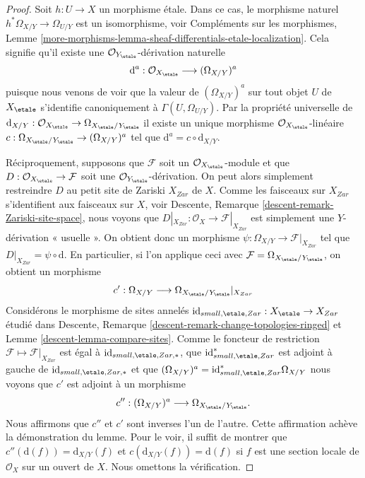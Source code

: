 \begin{proof}
Soit $h : U \to X$ un morphisme étale. Dans ce cas, le morphisme naturel
$h^*\Omega_{X/Y} \to \Omega_{U/Y}$ est un isomorphisme, voir
Compléments sur les morphismes,
Lemme \ref{more-morphisms-lemma-sheaf-differentials-etale-localization}.
Cela signifie qu'il existe une $\mathcal{O}_{Y_\etale}$-dérivation naturelle
$$
\text{d}^a : \mathcal{O}_{X_\etale} \longrightarrow (\Omega_{X/Y})^a
$$
puisque nous venons de voir que la valeur de $(\Omega_{X/Y})^a$ sur tout objet
$U$ de $X_\etale$ s'identifie canoniquement à
$\Gamma(U, \Omega_{U/Y})$. Par la propriété universelle de
$\text{d}_{X/Y} :
\mathcal{O}_{X_\etale}
\to
\Omega_{X_\etale/Y_\etale}$
il existe un unique morphisme $\mathcal{O}_{X_\etale}$-linéaire
$c : \Omega_{X_\etale/Y_\etale} \to (\Omega_{X/Y})^a$
tel que
$\text{d}^a = c \circ \text{d}_{X/Y}$.

\medskip\noindent
Réciproquement, supposons que $\mathcal{F}$ soit un
$\mathcal{O}_{X_\etale}$-module
et que $D : \mathcal{O}_{X_\etale} \to \mathcal{F}$ soit une
$\mathcal{O}_{Y_\etale}$-dérivation. On peut alors simplement restreindre
$D$ au petit site de Zariski $X_{Zar}$ de $X$. Comme les faisceaux sur $X_{Zar}$
s'identifient aux faisceaux sur $X$, voir
Descente, Remarque \ref{descent-remark-Zariski-site-space},
nous voyons que $D|_{X_{Zar}} : \mathcal{O}_X \to \mathcal{F}|_{X_{Zar}}$
est simplement une $Y$-dérivation « usuelle ». On obtient donc un morphisme
$\psi : \Omega_{X/Y} \longrightarrow \mathcal{F}|_{X_{Zar}}$
tel que $D|_{X_{Zar}} = \psi \circ \text{d}$. En particulier, si l'on
applique ceci avec $\mathcal{F} = \Omega_{X_\etale/Y_\etale}$,
on obtient un morphisme
$$
c' :
\Omega_{X/Y}
\longrightarrow
\Omega_{X_\etale/Y_\etale}|_{X_{Zar}}
$$
Considérons le morphisme de sites annelés
$\text{id}_{small, \etale, Zar} : X_\etale \to X_{Zar}$
étudié dans
Descente, Remarque \ref{descent-remark-change-topologies-ringed} et
Lemme \ref{descent-lemma-compare-sites}.
Comme le foncteur de restriction $\mathcal{F} \mapsto \mathcal{F}|_{X_{Zar}}$
est égal à $\text{id}_{small, \etale, Zar, *}$, que
$\text{id}_{small, \etale, Zar}^*$ est adjoint à gauche de
$\text{id}_{small, \etale, Zar, *}$ et que
$(\Omega_{X/Y})^a = \text{id}_{small, \etale, Zar}^*\Omega_{X/Y}$
nous voyons que $c'$ est adjoint à un morphisme
$$
c'' :
(\Omega_{X/Y})^a
\longrightarrow
\Omega_{X_\etale/Y_\etale}.
$$
Nous affirmons que $c''$ et $c'$ sont inverses l'un de l'autre.
Cette affirmation achève la démonstration du lemme.
Pour le voir, il suffit de montrer que $c''(\text{d}(f)) = \text{d}_{X/Y}(f)$
et $c(\text{d}_{X/Y}(f)) = \text{d}(f)$ si $f$ est une section locale de
$\mathcal{O}_X$ sur un ouvert de $X$. Nous omettons la vérification.
\end{proof}

